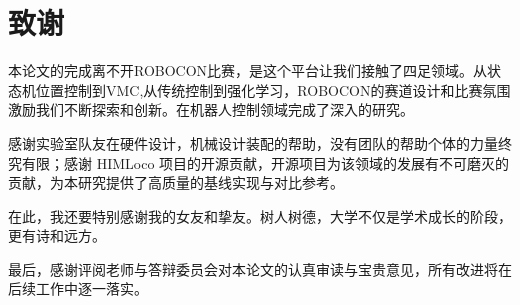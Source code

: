 \documentclass[12pt,a4paper]{ctexart}
\numberwithin{equation}{section}
\numberwithin{table}{section}
\numberwithin{figure}{section}
\begin{document}
\clearpage



\clearpage
\section*{致谢}
本论文的完成离不开ROBOCON比赛，是这个平台让我们接触了四足领域。从状态机位置控制到VMC,从传统控制到强化学习，ROBOCON的赛道设计和比赛氛围激励我们不断探索和创新。在机器人控制领域完成了深入的研究。

感谢实验室队友在硬件设计，机械设计装配的帮助，没有团队的帮助个体的力量终究有限；感谢 HIMLoco 项目的开源贡献，开源项目为该领域的发展有不可磨灭的贡献，为本研究提供了高质量的基线实现与对比参考。

在此，我还要特别感谢我的女友和挚友。树人树德，大学不仅是学术成长的阶段，更有诗和远方。

最后，感谢评阅老师与答辩委员会对本论文的认真审读与宝贵意见，所有改进将在后续工作中逐一落实。
\end{document}
